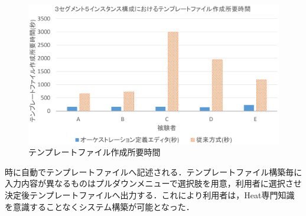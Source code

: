 \documentclass[a4j]{jarticle}
\begin{document}
\begin{Abstract}
 \begin{figure}[H]
 	\begin{center}
 		\vspace{-3mm}
 		\includegraphics[scale=0.27]{Document/Abstract_Comparison.eps}
 		\caption{テンプレートファイル作成所要時間}
 		\label{graf:2}
 	\end{center}
 \end{figure}
 \vspace{-4mm}
 \noindent 時に自動でテンプレートファイルへ記述される．テンプレートファイル構築毎に入力内容が異なるものはプルダウンメニューで選択肢を用意，利用者に選択させ決定後テンプレートファイルへ出力する．これにより利用者は，Heat専門知識を意識することなくシステム構築が可能となった．


\end{Abstract}
\end{document}
